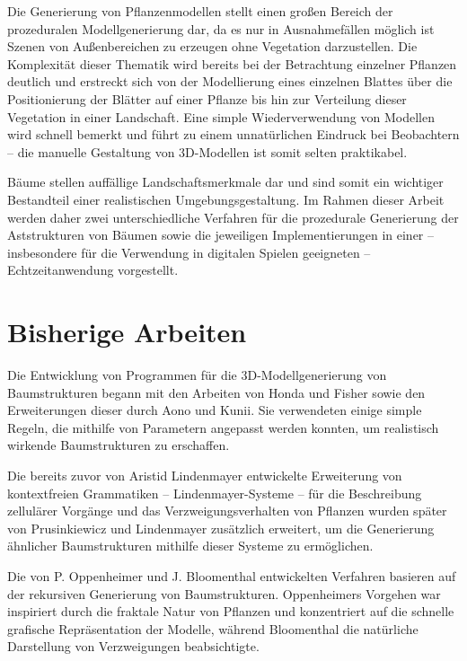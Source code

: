 Die Generierung von Pflanzenmodellen stellt einen großen Bereich der prozeduralen Modellgenerierung dar, da es nur in Ausnahmefällen möglich ist Szenen von Außenbereichen zu erzeugen ohne Vegetation darzustellen. Die Komplexität dieser Thematik wird bereits bei der Betrachtung einzelner Pflanzen deutlich und erstreckt sich von der Modellierung eines einzelnen Blattes über die Positionierung der Blätter auf einer Pflanze bis hin zur Verteilung dieser Vegetation in einer Landschaft. \cite[S.3]{Deussen:05} Eine simple Wiederverwendung von Modellen wird schnell bemerkt und führt zu einem unnatürlichen Eindruck bei Beobachtern -- die manuelle Gestaltung von 3D-Modellen ist somit selten praktikabel. \cite[S.73]{PCGiG:16}

Bäume stellen auffällige Landschaftsmerkmale dar und sind somit ein wichtiger Bestandteil einer realistischen Umgebungsgestaltung. Im Rahmen dieser Arbeit werden daher zwei unterschiedliche Verfahren für die prozedurale Generierung der Aststrukturen von Bäumen sowie die jeweiligen Implementierungen in einer -- insbesondere für die Verwendung in digitalen Spielen geeigneten -- Echtzeitanwendung vorgestellt. 

\section{Bisherige Arbeiten}

Die Entwicklung von Programmen für die 3D-Modellgenerierung von Baumstrukturen begann mit den Arbeiten von Honda und Fisher sowie den Erweiterungen dieser durch Aono und Kunii. Sie verwendeten einige simple Regeln, die mithilfe von Parametern angepasst werden konnten, um realistisch wirkende Baumstrukturen zu erschaffen. \cite[S.46f]{Deussen:05} \cite[S.1]{SpaceColonizationAlgorithm:07} 

Die bereits zuvor von Aristid Lindenmayer entwickelte Erweiterung von kontextfreien Grammatiken -- Lindenmayer-Systeme -- für die Beschreibung zellulärer Vorgänge und das Verzweigungsverhalten von Pflanzen wurden später von Prusinkiewicz und Lindenmayer zusätzlich erweitert, um die Generierung ähnlicher Baumstrukturen mithilfe dieser Systeme zu ermöglichen. \cite[S.43, 48]{Deussen:05} 

Die von P. Oppenheimer und J. Bloomenthal entwickelten Verfahren basieren auf der rekursiven Generierung von Baumstrukturen. Oppenheimers Vorgehen war inspiriert durch die fraktale Natur von Pflanzen und konzentriert auf die schnelle grafische Repräsentation der Modelle, während Bloomenthal die natürliche Darstellung von Verzweigungen beabsichtigte. \cite[S.49-52]{Deussen:05} 

